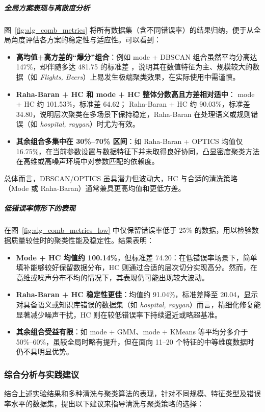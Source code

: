 \documentclass[10pt]{article} %
\numberwithin{equation}{section}
\begin{document}
\subparagraph{全局方案表现与离散度分析}
图~\ref{fig:alg_comb_metrics} 将所有数据集（含不同错误率）的结果归纳，便于从全局角度评估各方案的稳定性与适应性。可以看到：
\begin{itemize}
    \item \textbf{高均值+高方差的“爆分”组合}：例如 mode + DBSCAN 组合虽然平均分高达 147\%，却伴随多达 481.75 的标准差 ，说明其在数值特征为主、规模较大的数据（如 \textit{Flights, Beers}）上易发生极端聚类效果，在实际使用中需谨慎。
    \item \textbf{Raha-Baran + HC 和 mode + HC 整体分数高且方差相对适中}：  mode + HC 约 101.53\%，标准差 64.62； Raha-Baran + HC 约 90.03\%，标准差 34.80，说明层次聚类在多场景下保持稳定，Raha-Baran 在处理语义或规则错误（如 \textit{hospital, rayyan}）时尤为有效。
    \item \textbf{其余组合多集中在 30\%--70\% 区间}：如 Raha-Baran + OPTICS 均值仅 16.75\%，在当前参数设置与数据特征下并未取得良好协同，凸显密度聚类方法在高维或高噪声环境中对参数匹配的依赖度。
\end{itemize}
总体而言，DBSCAN/OPTICS 虽具潜力但波动大，HC 与合适的清洗策略（Mode 或 Raha-Baran）通常兼具更高均值和更低方差。

\subparagraph{低错误率情形下的表现}
在图~\ref{fig:alg_comb_metrics_low} 中仅保留错误率低于 25\% 的数据，用以检验数据质量较佳时的聚类性能及稳定性。结果表明：
\begin{itemize}
    \item \textbf{Mode + HC 均值约 100.14\%}，但标准差 74.20：在低错误率场景下，简单填补能够较好保留数据分布，HC 则通过合适的层次切分实现高分。然而，在高维或噪声分布不均的情况下，其表现仍可能出现较大波动。
    \item \textbf{Raha-Baran + HC 稳定性更佳}：均值约 91.04\%，标准差降至 20.04，显示对具备语义或知识库错误的数据集（如 \textit{hospital, rayyan}）而言，精细化修复能显著减少噪声干扰，HC 则在较低错误率下持续逼近或略超基准。
    \item \textbf{其余组合受益有限}：如 mode + GMM、mode + KMeans 等平均分多介于 50\%--60\%，虽较全局时略有提升，但在面向 11--20 个特征的中等维度数据时仍不具明显优势。
\end{itemize}

\subsubsection{综合分析与实践建议}
结合上述实验结果和多种清洗与聚类算法的表现，针对不同规模、特征类型及错误率水平的数据集，提出以下建议来指导清洗与聚类策略的选择：
\end{document}
